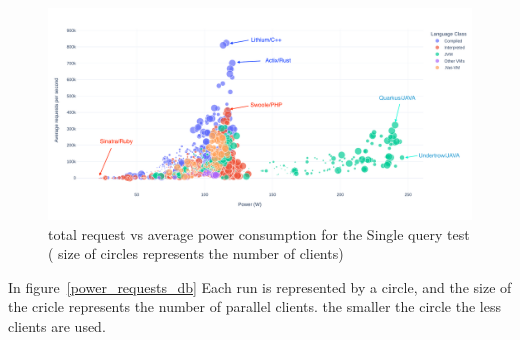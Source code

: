\begin{figure}[bht]
    \centering
    \includegraphics[width=
        \columnwidth]{imgs/power_requests_db}
    \caption{total request vs average power consumption for the Single query test ( size of circles represents the number of clients)}
    \label{fig:power_requests_db}
\end{figure}


In figure~\ref{power_requests_db} Each run is represented by a circle, and the size of the cricle represents the number of parallel clients. the smaller the circle the less clients are used.




